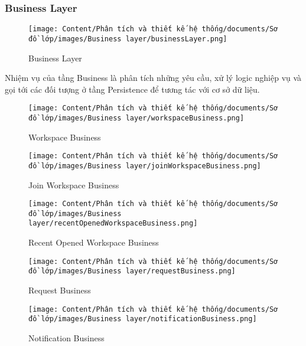 \subsubsection{Business Layer}

\begin{figure}[H]
    \centering
    \texttt{[image: Content/Phân tích và thiết kế hệ thống/documents/Sơ đồ lớp/images/Business layer/businessLayer.png]}
    \vspace{0.5cm}
    \caption{Business Layer}
    \label{fig:Business Layer}
\end{figure}

Nhiệm vụ của tầng Business là phân tích những yêu cầu, xử lý logic nghiệp vụ và
gọi tới các đối tượng ở tầng Persistence để tương tác với cơ sở dữ liệu.

\begin{figure}[H]
    \centering
    \texttt{[image: Content/Phân tích và thiết kế hệ thống/documents/Sơ đồ lớp/images/Business layer/workspaceBusiness.png]}
    \vspace{0.5cm}
    \caption{Workspace Business}
    \label{fig:Workspace Business}
\end{figure}

\begin{figure}[H]
    \centering
    \texttt{[image: Content/Phân tích và thiết kế hệ thống/documents/Sơ đồ lớp/images/Business layer/joinWorkspaceBusiness.png]}
    \vspace{0.5cm}
    \caption{Join Workspace Business}
    \label{fig:Join Workspace Business}
\end{figure}

\begin{figure}[H]
    \centering
    \texttt{[image: Content/Phân tích và thiết kế hệ thống/documents/Sơ đồ lớp/images/Business layer/recentOpenedWorkspaceBusiness.png]}
    \vspace{0.5cm}
    \caption{Recent Opened Workspace Business}
    \label{fig:Recent Opened Workspace Business}
\end{figure}

\begin{figure}[H]
    \centering
    \texttt{[image: Content/Phân tích và thiết kế hệ thống/documents/Sơ đồ lớp/images/Business layer/requestBusiness.png]}
    \vspace{0.5cm}
    \caption{Request Business}
    \label{fig:Request Business}
\end{figure}

\begin{figure}[H]
    \centering
    \texttt{[image: Content/Phân tích và thiết kế hệ thống/documents/Sơ đồ lớp/images/Business layer/notificationBusiness.png]}
    \vspace{0.5cm}
    \caption{Notification Business}
    \label{fig:Notification Business}
\end{figure}

